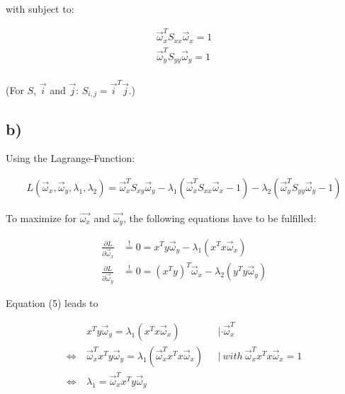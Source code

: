 \documentclass{article}
\begin{document}
with subject to:

\begin{equation}
\begin{aligned}
\vec{\omega}_x^T S_{xx} \vec{\omega}_x = 1\\
\vec{\omega}_y^T S_{yy} \vec{\omega}_y = 1\\
\end{aligned}
\end{equation}

(For $S$, $\vec{i}$ and $\vec{j}$: $S_{i, j} = \vec{i}^T\vec{j}$.)

\subsection*{b)}

Using the Lagrange-Function:

\begin{equation}
\begin{aligned}
L(\vec{\omega}_x, \vec{\omega}_y, \lambda_1, \lambda_2) = \vec{\omega}_x^T S_{xy}\vec{\omega}_y - \lambda_1(\vec{\omega}_x^T S_{xx}\vec{\omega}_x - 1) - \lambda_2 (\vec{\omega}_y^T S_{yy}\vec{\omega}_y - 1)
\end{aligned}
\end{equation}

To maximize for $\vec{\omega_x}$ and $\vec{\omega_y}$, the following equations have to be fulfilled:

\begin{align}
\frac{\partial L}{\partial \vec{\omega}_x} &\overset{!}{=} 0 = x^T y \vec{\omega}_y - \lambda_1(x^Tx\vec{\omega}_x)\\
\frac{\partial L}{\partial \vec{\omega}_y} &\overset{!}{=} 0 = (x^T y)^T \vec{\omega}_x - \lambda_2(y^Ty\vec{\omega}_y)
\end{align}

Equation (5) leads to

\begin{equation}
\begin{aligned}
&x^T y \vec{\omega}_y = \lambda_1(x^Tx\vec{\omega}_x) & ~~~| \cdot \vec{\omega}_x^T\\
\Leftrightarrow ~ & \vec{\omega}_x^T x^T y \vec{\omega}_y = \lambda_1(\vec{\omega}_x^T x^Tx\vec{\omega}_x) & ~~~| ~ with ~ \vec{\omega}_x^T x^Tx\vec{\omega}_x = 1 \\
\Leftrightarrow ~ &\lambda_1 = \vec{\omega}_x^T x^T y \vec{\omega}_y
\end{aligned}
\end{equation}
\end{document}
